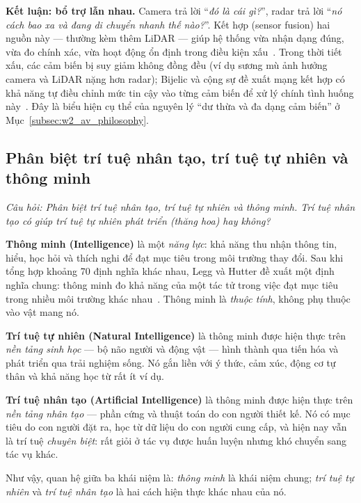 \textbf{Kết luận: bổ trợ lẫn nhau.} Camera trả lời ``\emph{đó là cái gì?}'', radar trả lời ``\emph{nó cách bao xa và đang di chuyển nhanh thế nào?}''. Kết hợp (sensor fusion) hai nguồn này — thường kèm thêm LiDAR — giúp hệ thống vừa nhận dạng đúng, vừa đo chính xác, vừa hoạt động ổn định trong điều kiện xấu~\citep{feng2021deep}. Trong thời tiết xấu, các cảm biến bị suy giảm không đồng đều (ví dụ sương mù ảnh hưởng camera và LiDAR nặng hơn radar); Bijelic và cộng sự đề xuất mạng kết hợp có khả năng tự điều chỉnh mức tin cậy vào từng cảm biến để xử lý chính tình huống này~\citep{bijelic2020seeing}. Đây là biểu hiện cụ thể của nguyên lý ``dư thừa và đa dạng cảm biến'' ở Mục~\ref{subsec:w2_av_philosophy}.

\subsection{Phân biệt trí tuệ nhân tạo, trí tuệ tự nhiên và thông minh}
\label{subsec:w2_ai_ni}

\textit{Câu hỏi: Phân biệt trí tuệ nhân tạo, trí tuệ tự nhiên và thông minh. Trí tuệ nhân tạo có giúp trí tuệ tự nhiên phát triển (thăng hoa) hay không?}

\textbf{Thông minh (Intelligence)} là một \emph{năng lực}: khả năng thu nhận thông tin, hiểu, học hỏi và thích nghi để đạt mục tiêu trong môi trường thay đổi. Sau khi tổng hợp khoảng 70 định nghĩa khác nhau, Legg và Hutter đề xuất một định nghĩa chung: thông minh đo khả năng của một tác tử trong việc đạt mục tiêu trong nhiều môi trường khác nhau~\citep{legg2007collection}. Thông minh là \emph{thuộc tính}, không phụ thuộc vào vật mang nó.

\textbf{Trí tuệ tự nhiên (Natural Intelligence)} là thông minh được hiện thực trên \emph{nền tảng sinh học} — bộ não người và động vật — hình thành qua tiến hóa và phát triển qua trải nghiệm sống. Nó gắn liền với ý thức, cảm xúc, động cơ tự thân và khả năng học từ rất ít ví dụ.

\textbf{Trí tuệ nhân tạo (Artificial Intelligence)} là thông minh được hiện thực trên \emph{nền tảng nhân tạo} — phần cứng và thuật toán do con người thiết kế. Nó có mục tiêu do con người đặt ra, học từ dữ liệu do con người cung cấp, và hiện nay vẫn là trí tuệ \emph{chuyên biệt}: rất giỏi ở tác vụ được huấn luyện nhưng khó chuyển sang tác vụ khác.

Như vậy, quan hệ giữa ba khái niệm là: \emph{thông minh} là khái niệm chung; \emph{trí tuệ tự nhiên} và \emph{trí tuệ nhân tạo} là hai cách hiện thực khác nhau của nó.

